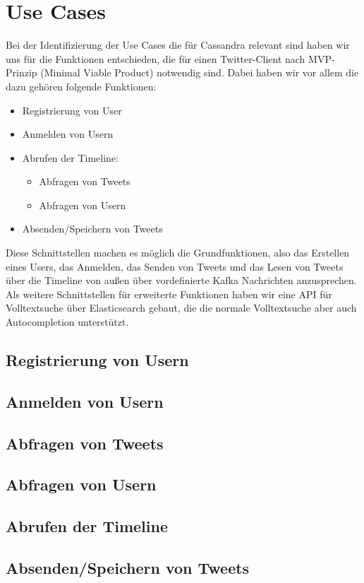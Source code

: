\section{Use Cases}
\label{sec:usecase}
Bei der Identifizierung der Use Cases die für Cassandra relevant sind haben wir uns für die Funktionen entschieden, die für einen Twitter-Client nach MVP-Prinzip (Minimal Viable Product) notwendig sind. Dabei haben wir vor allem die dazu gehören folgende Funktionen:
\begin{itemize}
	\item Registrierung von User
	\item Anmelden von Usern
	\item Abrufen der Timeline:
		\begin{itemize}
			\item Abfragen von Tweets
			\item Abfragen von Usern
		\end{itemize}
	\item Absenden/Speichern von Tweets
\end{itemize}
Diese Schnittstellen machen es möglich die Grundfunktionen, also das Erstellen eines Users, das Anmelden, das Senden von Tweets und das Lesen von Tweets über die Timeline von außen über vordefinierte Kafka Nachrichten anzusprechen.
Als weitere Schnittstellen für erweiterte Funktionen haben wir eine API für Volltextsuche über Elasticsearch gebaut, die die normale Volltextsuche aber auch Autocompletion unterstützt.\\ 




\subsection{Registrierung von Usern}

\subsection{Anmelden von Usern}

\subsection{Abfragen von Tweets}

\subsection{Abfragen von Usern}

\subsection{Abrufen der Timeline}

\subsection{Absenden/Speichern von Tweets}
